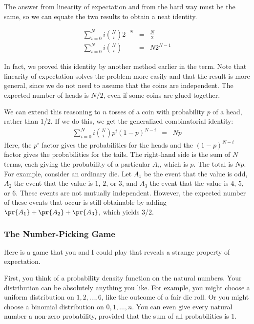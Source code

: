 The answer from linearity of expectation and from the hard way must be
the same, so we can equate the two results to obtain a neat identity.

\begin{eqnarray*}
\sum_{i=0}^N i \binom{N}{i} 2^{-N} & = & \frac{N}{2} \\
\sum_{i=0}^N i \binom{N}{i} & = & N2^{N-1}
\end{eqnarray*}

In fact, we proved this identity by another method earlier in the
term.  Note that linearity of expectation solves the problem more
easily and that the result is more general, since we do not need to
assume that the coins are independent.  The expected number of
heads is $N/2$, even if some coins are glued together.

We can extend this reasoning to $n$ tosses of a coin with probability $p$
of a head, rather than 1/2.  If we do this, we get the generalized
combinatorial identity:
\begin{eqnarray*}
\sum_{i=0}^N i \binom{N}{i} p^i (1-p)^{N-i} & = & N p
\end{eqnarray*}
Here, the $p^i$ factor gives the probabilities for the heads and the
$(1-p)^{N-i}$ factor gives the probabilities for the tails.  The
right-hand side is the sum of $N$ terms, each giving the probability
of a particular $A_i$, which is $p$.  The total is $N p$.  For
example, consider an ordinary die.  Let $A_1$ be the event that the
value is odd, $A_2$ the event that the value is $1$, $2$, or $3$, and
$A_3$ the event that the value is $4$, $5$, or $6$.  These events are
not mutually independent.  However, the expected number of these
events that occur is still obtainable by adding $\pr{A_1} + \pr{A_2} +
\pr{A_3}$, which yields 3/2.

\subsubsection{The Number-Picking Game}

Here is a game that you and I could play that reveals a strange
property of expectation.

First, you think of a probability density function on the natural
numbers.  Your distribution can be absolutely anything you like.  For
example, you might choose a uniform distribution on $1, 2, \dots, 6$,
like the outcome of a fair die roll.  Or you might choose a binomial
distribution on $0, 1, \dots, n$.  You can even give every natural
number a non-zero probability, provided that the sum of all
probabilities is 1.

